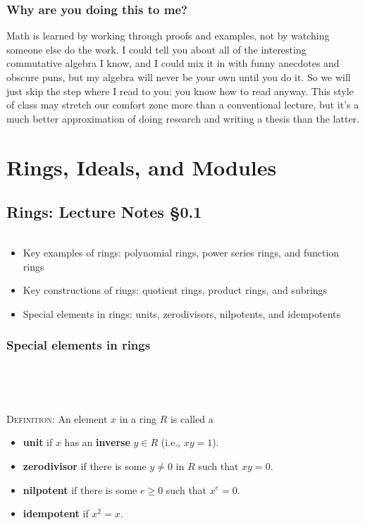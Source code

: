 \documentclass[12pt]{amsart}
\newcommand{\0}{$\phantom{.}$}
\newcommand{\1}{\mathbbm{1}}
\begin{document}
\subsubsection*{Why are you doing this to me?\nopunct} Math is learned by working through proofs and examples, not by watching someone else do the work. I could tell you about all of the interesting commutative algebra I know, and I could mix it in with funny anecdotes and obscure puns, but my algebra will never be your own until you do it. So we will just skip the step where I read to you: you know how to read anyway. This style of class may stretch our comfort zone more than a conventional lecture, but it's a much better approximation of doing research and writing a thesis than the latter.



\newpage



\section{Rings, Ideals, and Modules}

\subsection{Rings: Lecture Notes \S0.1} \0

\begin{framed}
\begin{itemize}
\item Key examples of rings: polynomial rings, power series rings, and function rings
\item Key constructions of rings: quotient rings, product rings, and subrings
\item Special elements in rings: units, zerodivisors, nilpotents, and idempotents
\end{itemize}
\end{framed}

\subsubsection*{Special elements in rings}

\

\

\noindent \textsc{Definition:} An element $x$ in a ring $R$ is called a
\begin{itemize}
\item \textbf{unit} if $x$ has an \textbf{inverse} $y\in R$ (i.e., $xy=1$).
\item \textbf{zerodivisor} if there is some $y\neq 0$ in $R$ such that $xy=0$.
\item \textbf{nilpotent} if there is some $e\geq 0$ such that $x^e=0$.
\item \textbf{idempotent} if $x^2 = x$.
\end{itemize}
\end{document}
